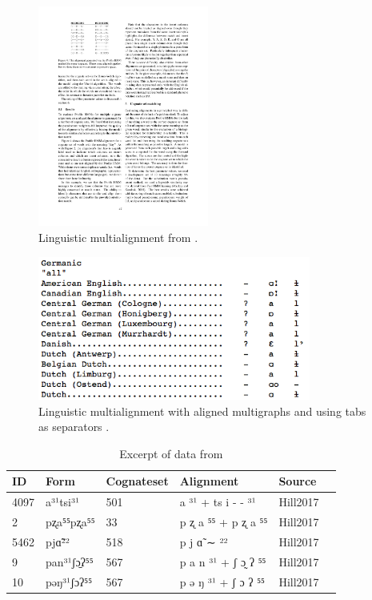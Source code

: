 \documentclass[11pt]{article}
\begin{document}
\begin{figure}[htbp]
  \centering
  \includegraphics[width=0.5\textwidth]{images/multialign_bhargava.pdf}
  \caption{Linguistic multialignment from \textcite[47]{bhargava2009}.}
  \label{fig:multialign_bhargava}
\end{figure}

\begin{figure}[htbp]
  \centering
  \includegraphics[width=0.8\textwidth]{images/multialign_list.png}
  \caption{Linguistic multialignment with aligned multigraphs and using tabs as separators \parencite{list2014benchmark}.}
  \label{fig:multialign_list}
\end{figure}

\begin{table}[htp]
\centering
\begin{tabular}{llllll}                                              \hline
 ID   & Form        & Cognateset & Alignment           & Source   \\ \hline
 4097 & a³¹tsi³¹    & 501        & a ³¹ + ts i - - ³¹  & Hill2017 \\
 2    & pʐa⁵⁵pʐa⁵⁵  & 33         & p ʐ a ⁵⁵ + p ʐ a ⁵⁵ & Hill2017 \\ 
 5462 & pjɑ̃²²       & 518        & p j ɑ̃ ∼ ²²          & Hill2017 \\ 
 9    & pan³¹ʃɔ̱ʔ⁵⁵  & 567        & p a n ³¹ + ʃ ɔ̰ ʔ ⁵⁵ & Hill2017 \\ 
 10   & pəŋ³¹ʃɔʔ⁵⁵  & 567        & p ə ŋ ³¹ + ʃ ɔ ʔ ⁵⁵ & Hill2017 \\ \hline
\end{tabular}
\caption{Excerpt of data from \textcite{hill2017}}
\label{tab:data_hill}
\end{table}
\end{document}
